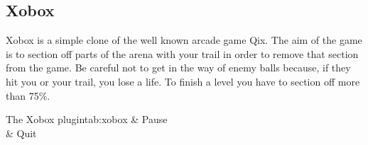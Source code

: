 \subsection{Xobox}
Xobox is a simple clone of the well known arcade game Qix.
The aim of the game is to section off parts of the arena with your trail in
order to remove that section from the game. Be careful not to get in the way of
enemy balls because, if they hit you or your trail, you lose a life.
To finish a level you have to section off more than 75\%.

\begin{table}
\begin{btnmap}{The Xobox plugin}{tab:xobox}
    & Pause\\
    & Quit\\
\end{btnmap}
\end{table}


